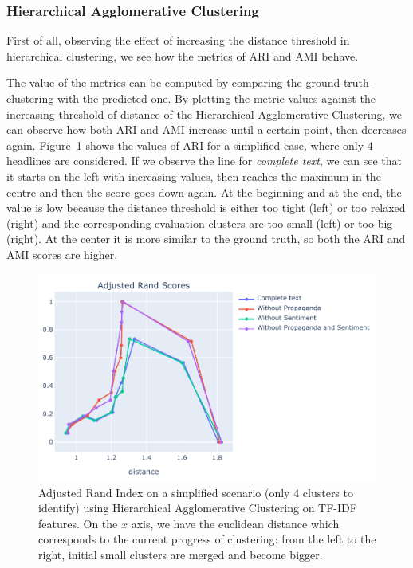 \subsubsection{Hierarchical Agglomerative Clustering}
First of all, observing the effect of increasing the distance threshold in hierarchical clustering, we see how the metrics of ARI and AMI behave.

The value of the metrics can be computed by comparing the ground-truth-clustering with the predicted one.
By plotting the metric values against the increasing threshold of distance of the Hierarchical Agglomerative Clustering, we can observe how both ARI and AMI increase until a certain point, then decreases again.
Figure~\ref{fig:hierarchical_sentpropnoise_evolution} shows the values of ARI for a simplified case, where only $4$ headlines are considered. If we observe the line for \textit{complete text}, we can see that it starts on the left with increasing values, then reaches the maximum in the centre and then the score goes down again. At the beginning and at the end, the value is low because the distance threshold is either too tight (left) or too relaxed (right) and the corresponding evaluation clusters are too small (left) or too big (right).
At the center it is more similar to the ground truth, so both the ARI and AMI scores are higher.

\begin{figure}[!htbp]
    \centering
    \includegraphics[width=\linewidth]{figures/sentpropnoise_4_en_tfidf_fitness_topic-cropped.pdf}
    \caption{Adjusted Rand Index on a simplified scenario (only 4 clusters to identify) using Hierarchical Agglomerative Clustering on TF-IDF features. On the $x$ axis, we have the euclidean distance which corresponds to the current progress of clustering: from the left to the right, initial small clusters are merged and become bigger.}
    \label{fig:hierarchical_sentpropnoise_evolution}
\end{figure}

